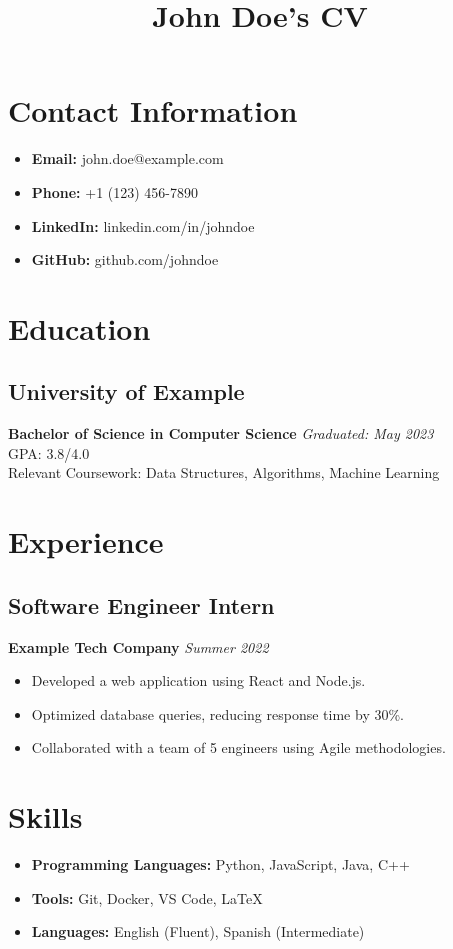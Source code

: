 \documentclass[11pt]{article}
\title{\textbf{John Doe's CV}}
\author{}
\date{}
\begin{document}
\maketitle

\section*{Contact Information}
\begin{itemize}[leftmargin=*]
    \item \textbf{Email:} john.doe@example.com
    \item \textbf{Phone:} +1 (123) 456-7890
    \item \textbf{LinkedIn:} linkedin.com/in/johndoe
    \item \textbf{GitHub:} github.com/johndoe
\end{itemize}

\section*{Education}
\subsection*{University of Example}
\textbf{Bachelor of Science in Computer Science} \hfill \textit{Graduated: May 2023} \\
GPA: 3.8/4.0 \\
Relevant Coursework: Data Structures, Algorithms, Machine Learning

\section*{Experience}
\subsection*{Software Engineer Intern}
\textbf{Example Tech Company} \hfill \textit{Summer 2022} \\
\begin{itemize}[leftmargin=*]
    \item Developed a web application using React and Node.js.
    \item Optimized database queries, reducing response time by 30\%.
    \item Collaborated with a team of 5 engineers using Agile methodologies.
\end{itemize}

\section*{Skills}
\begin{itemize}[leftmargin=*]
    \item \textbf{Programming Languages:} Python, JavaScript, Java, C++
    \item \textbf{Tools:} Git, Docker, VS Code, LaTeX
    \item \textbf{Languages:} English (Fluent), Spanish (Intermediate)
\end{itemize}
\end{document}
